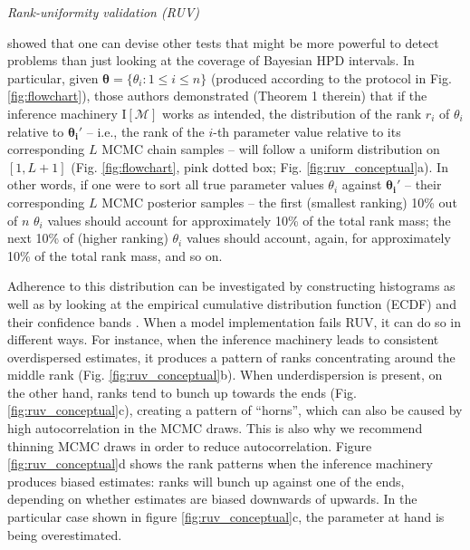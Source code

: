 \documentclass[oneside]{article}
\begin{document}
\vspace{.25cm}

\noindent \emph{Rank-uniformity validation (RUV)}

\cite{Talts2018} showed that one can devise other tests that might be more powerful to detect problems than just looking at the coverage of Bayesian HPD intervals.
In particular, given $\boldsymbol{\theta} = \{\theta_i : 1 \leq i \leq n\}$ (produced according to the protocol in Fig. \ref{fig:flowchart}), those authors demonstrated (Theorem 1 therein) that if the inference machinery $\text{I}[\mathcal{M}]$ works as intended, the distribution of the rank $r_i$ of $\theta_i$ relative to $\boldsymbol{\theta_i'}$ -- i.e., the rank of the $i$-th parameter value relative to its corresponding $L$ MCMC chain samples --
will follow a uniform distribution on $[1, L + 1]$ (Fig. \ref{fig:flowchart}, pink dotted box; Fig. \ref{fig:ruv_conceptual}a).
In other words, if one were to sort all true parameter values $\theta_i$ against $\boldsymbol{\theta_i'}$ -- their corresponding $L$ MCMC posterior samples -- the first (smallest ranking) 10\% out of $n$ $\theta_i$ values should account for approximately 10\% of the total rank mass; the next 10\% of (higher ranking) $\theta_i$ values should account, again, for approximately 10\% of the total rank mass, and so on.


Adherence to this distribution can be investigated by constructing histograms \citep{Talts2018} as well as by looking at the empirical cumulative distribution function (ECDF) and their confidence bands \citep{Sailynoja2021}.
When a model implementation fails RUV, it can do so in different ways.
For instance, when the inference machinery leads to consistent overdispersed estimates, it produces a pattern of ranks concentrating around the middle rank (Fig. \ref{fig:ruv_conceptual}b).
When underdispersion is present, on the other hand, ranks tend to bunch up towards the ends (Fig. \ref{fig:ruv_conceptual}c), creating a pattern of ``horns'', which can also be caused by high autocorrelation in the MCMC draws.
This is also why we recommend thinning MCMC draws in order to reduce autocorrelation.
Figure \ref{fig:ruv_conceptual}d shows the rank patterns when the inference machinery produces biased estimates: ranks will bunch up against one of the ends, depending on whether estimates are biased downwards of upwards.
In the particular case shown in figure \ref{fig:ruv_conceptual}c, the parameter at hand is being overestimated.
\end{document}
